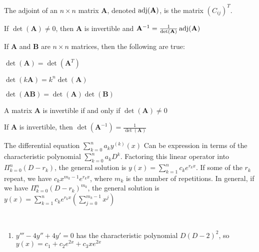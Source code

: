     \begin{definition}
        The adjoint of an ${n}\times{n}$ matrix
        $\mathbf{A}$, denoted $\operatorname{adj}(\mathbf{A})$,
        is the matrix $(C_{ij})^{T}$.
    \end{definition}
    \begin{theorem}
        If ${\det(\mathbf{A})}\ne{0}$, then $\mathbf{A}$
        is invertible and
        $\mathbf{A}^{-1}=%
         \frac{1}{\det(\mathbf{A})}\adjoint(\mathbf{A})$
    \end{theorem}
    \begin{theorem}
        If $\mathbf{A}$ and $\mathbf{B}$ are
        ${n}\times{n}$ matrices, then the following
        are true:
        \begin{enumerate}
            \begin{multicols}{3}
                \item $\det(\mathbf{A})%
                       =\det(\mathbf{A}^{T})$
                \item $\det(k\mathbf{A})%
                       =k^{n}\det(\mathbf{A})$
                \item $\det(\mathbf{A}\mathbf{B})%
                       =\det(\mathbf{A})\det(\mathbf{B})$
            \end{multicols}
        \end{enumerate}
    \end{theorem}
    \begin{theorem}
        A matrix $\mathbf{A}$ is invertible if and only
        if ${\det(\mathbf{A})}\ne{0}$
    \end{theorem}
    \begin{theorem}
        If $\mathbf{A}$ is invertible, then
        $\det(\mathbf{A}^{-1})=\frac{1}{\det(\mathbf{A})}$
    \end{theorem}
    The differential equation
    $\sum_{k=0}^{n}a_{k}y^{(k)}(x)$ Can be expression
    in terms of the characteristic polynomial
    $\sum_{k=0}^{n}a_{k}D^{k}$. Factoring this linear
    operator into $\Pi_{k=0}^{n}(D-r_{k})$,
    the general solution is
    $y(x)=\sum_{k=1}^{n}c_{k}e^{r_{k}x}$. If some of the
    $r_{k}$ repeat, we have $c_{k}x^{m_{k}-1}e^{r_{k}x}$,
    where $m_{k}$ is the number of repetitions.
    In general, if we have
    $\Pi_{k=0}^{n}(D-r_{k})^{m_{k}}$, the general
    solution is
    $y(x)=%
     \sum_{k=1}^{n}c_{k}e^{r_{k}x}%
     (\sum_{j=0}^{m_{k}-1}x^{j})$
    \begin{example}
        \
        \begin{enumerate}
            \item $y'''-4y''+4y'=0$ has the characteristic
                polynomial $D(D-2)^{2}$, so
                $y(x)=c_{1}+c_{2}e^{2x}+c_{3}xe^{2x}$
        \end{enumerate}
    \end{example}

